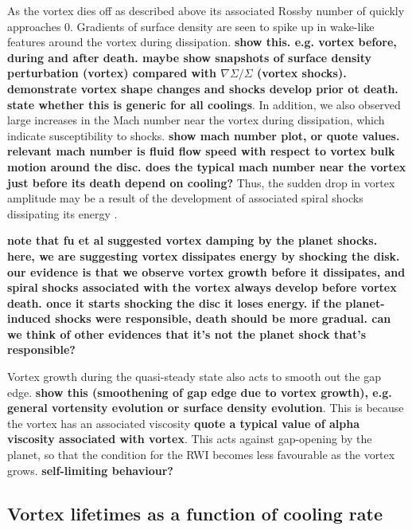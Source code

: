 As the vortex dies off as described above its associated Rossby number
of quickly approaches $0$. Gradients of surface density are seen to
spike up in wake-like features around the vortex during dissipation. 
{\bf show
  this. e.g. vortex before, during and after death. maybe show
  snapshots of surface density perturbation (vortex) compared with
  $\nabla\Sigma/\Sigma$ (vortex shocks). demonstrate vortex shape
  changes and shocks develop prior ot death. state whether this is
  generic for all coolings}.  
In addition, we also observed large increases in the Mach number near
the vortex during dissipation, which indicate susceptibility to
shocks. {\bf show mach number plot, or quote values. relevant mach
  number is fluid flow speed with respect to 
  vortex bulk motion around the disc. does the typical mach number
  near the vortex just before its death depend on cooling?} 
Thus, the sudden drop in vortex amplitude may  
be a result of the development of associated spiral shocks dissipating
its energy \citep[cf.][who 
  suggested damping due to planet-induced shocks]{fu14}.  

{\bf note that fu et al suggested vortex damping by the planet
  shocks. here, we are suggesting vortex dissipates energy by shocking
  the disk. our evidence is that we observe vortex growth before it
  dissipates, and spiral shocks associated with the vortex always
  develop before vortex death. once it starts shocking the disc it
  loses energy. if the planet-induced shocks were responsible, death
  should be more gradual. can we think of other evidences that it's
  not the planet shock that's responsible?                    
}

Vortex growth during the quasi-steady state also acts to smooth out
the gap edge. 
{\bf show this (smoothening of gap edge due to vortex growth),
  e.g. general vortensity evolution or surface density 
  evolution}. 
This is because the vortex has an associated viscosity {\bf quote a
  typical value of alpha viscosity associated with vortex}. This acts
against gap-opening by the planet, so that the condition for the RWI
becomes less favourable as the vortex grows. {\bf self-limiting
  behaviour?} 

\subsection{Vortex lifetimes as a function of cooling rate}

